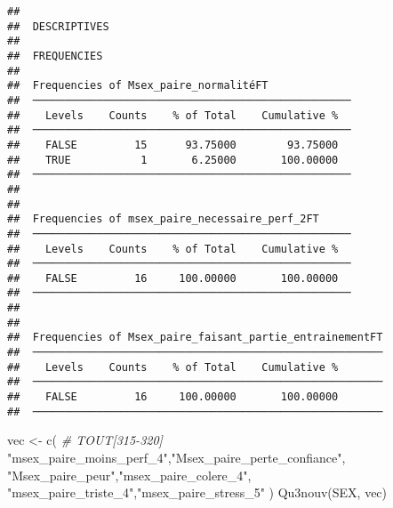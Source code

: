 \documentclass[
]{article}
\newenvironment{Shaded}{\begin{snugshade}}{\end{snugshade}}
\newcommand{\CommentTok}[1]{\textcolor[rgb]{0.56,0.35,0.01}{\textit{#1}}}
\newcommand{\FunctionTok}[1]{\textcolor[rgb]{0.00,0.00,0.00}{#1}}
\newcommand{\NormalTok}[1]{#1}
\newcommand{\OtherTok}[1]{\textcolor[rgb]{0.56,0.35,0.01}{#1}}
\newcommand{\StringTok}[1]{\textcolor[rgb]{0.31,0.60,0.02}{#1}}
\begin{document}
\begin{verbatim}
## 
##  DESCRIPTIVES
## 
##  FREQUENCIES
## 
##  Frequencies of Msex_paire_normalitéFT              
##  ────────────────────────────────────────────────── 
##    Levels    Counts    % of Total    Cumulative %   
##  ────────────────────────────────────────────────── 
##    FALSE         15      93.75000        93.75000   
##    TRUE           1       6.25000       100.00000   
##  ────────────────────────────────────────────────── 
## 
## 
##  Frequencies of msex_paire_necessaire_perf_2FT      
##  ────────────────────────────────────────────────── 
##    Levels    Counts    % of Total    Cumulative %   
##  ────────────────────────────────────────────────── 
##    FALSE         16     100.00000       100.00000   
##  ────────────────────────────────────────────────── 
## 
## 
##  Frequencies of Msex_paire_faisant_partie_entrainementFT 
##  ─────────────────────────────────────────────────────── 
##    Levels    Counts    % of Total    Cumulative %   
##  ─────────────────────────────────────────────────────── 
##    FALSE         16     100.00000       100.00000   
##  ───────────────────────────────────────────────────────
\end{verbatim}

\begin{Shaded}
\begin{Highlighting}[]
\NormalTok{vec }\OtherTok{\textless{}{-}} \FunctionTok{c}\NormalTok{(  }\CommentTok{\# TOUT[315{-}320]}
  \StringTok{"msex\_paire\_moins\_perf\_4"}\NormalTok{,}\StringTok{"Msex\_paire\_perte\_confiance"}\NormalTok{,                   }
  \StringTok{"Msex\_paire\_peur"}\NormalTok{,}\StringTok{"msex\_paire\_colere\_4"}\NormalTok{,                 }
  \StringTok{"msex\_paire\_triste\_4"}\NormalTok{,}\StringTok{"msex\_paire\_stress\_5"}  
\NormalTok{  )}
\FunctionTok{Qu3nouv}\NormalTok{(SEX, vec)}
\end{Highlighting}
\end{Shaded}
\end{document}
